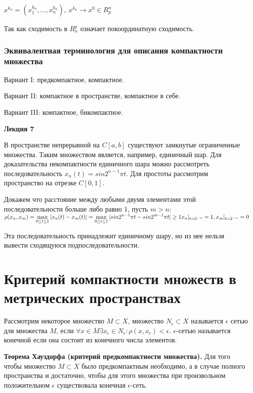 \documentclass[12pt]{report}
\renewcommand{\[}{$\\\displaystyle}
\renewcommand{\]}{\\$}
\renewcommand{\[}{$\\\displaystyle}
\newcommand{\sep}{,\ }
\newcommand{\tth}[1][]{\textbf{Теорема#1.}}
\begin{document}
$x^{k_n}=(x_1^{k_n},\dots,x_n^{k_n})\sep x^{k_n}\rightarrow x^0 \in R_p^n$

Так как сходимость в $R_n^p$ означает покоординатную сходимость.

\subsubsection{Эквивалентная терминология для описания компактности множества}

Вариант I: предкомпактное, компактное.

Вариант II: компактное в пространстве, компактное в себе.

Вариант III: компактное, бикомпактное.

\textbf{Лекция 7}

В пространстве непрерывной на $C[a,b]$ существуют замкнутые ограниченные множества. Таким множеством является, например, единичный шар. Для доказательства некомпактности единичного шара можно рассмотреть последовательность $x_n(t)=sin2^{n-1}\pi t$. Для простоты рассмотрим пространство на отрезке $C[0,1]$.

Докажем что расстояние между любыми двумя элементами этой последовательности больше либо равно 1, пусть $m>n$:
\[
\rho(x_n,x_m) = \max_{0\leq t \leq 1} |x_n(t)-x_m(t)| = \max_{0\leq t \leq 1} |sin 2^{n-1}\pi t-sin 2^{m-1}\pi t|\geq 1\\
x_n|_{t=2^{-n}}=1, x_m|_{t=2^{-n}}=0
\]

Эта последовательность принадлежит единичному шару, но из нее нельзя вывести сходящуюся подпоследовательности.

\section{Критерий компактности множеств в метрических пространствах}

Рассмотрим некоторое множество $M\subset X$, множество $N_{\epsilon} \subset X$ называется $\epsilon$ сетью для множества $M$, если $\forall x \in M \exists x_{\epsilon} \in N_{\epsilon}: \rho(x,x_{\epsilon})<\epsilon$. $\epsilon$-сетью называется конечной если она состоит из конечного числа элементов.

\tth[ Хауздорфа (критерий предкомпактности множества)] Для того чтобы множество $M\subset X$ было предкомпактным необходимо, а в случае полного пространства и достаточно, чтобы для этого множества при произвольном положительном $\epsilon$ существовала конечная $\epsilon$-сеть.
\end{document}
